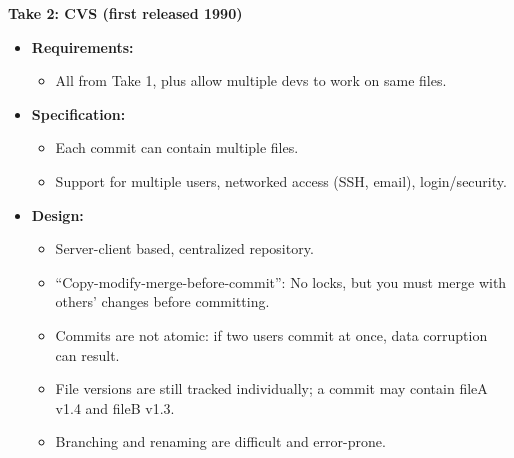 \documentclass[11pt,a4paper]{article}
\begin{document}
\textbf{Take 2: CVS (first released 1990)}
\begin{itemize}
    \item \textbf{Requirements:}
        \begin{itemize}
            \item All from Take 1, plus allow multiple devs to work on same files.
        \end{itemize}
    \item \textbf{Specification:}
        \begin{itemize}
            \item Each commit can contain multiple files.
            \item Support for multiple users, networked access (SSH, email), login/security.
        \end{itemize}
    \item \textbf{Design:}
        \begin{itemize}
            \item Server-client based, centralized repository.
            \item ``Copy-modify-merge-before-commit'': No locks, but you must merge with others’ changes before committing.
            \item Commits are not atomic: if two users commit at once, data corruption can result.
            \item File versions are still tracked individually; a commit may contain fileA v1.4 and fileB v1.3.
            \item Branching and renaming are difficult and error-prone.
        \end{itemize}
\end{itemize}
\end{document}

